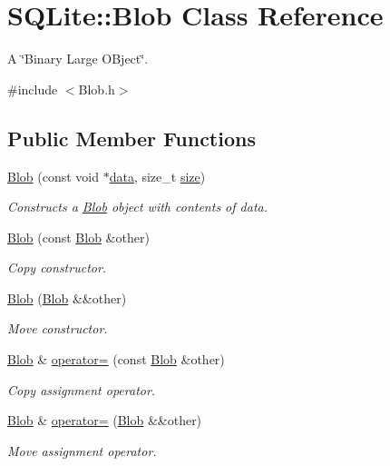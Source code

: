 \hypertarget{a00002}{\section{S\-Q\-Lite\-:\-:Blob Class Reference}
\label{a00002}
}


A \char`\"{}\-Binary Large O\-Bject\char`\"{}.  




{\ttfamily \#include $<$Blob.\-h$>$}

\subsection*{Public Member Functions}
\begin{DoxyCompactItemize}
\item 
\hyperlink{a00002_a74ff754db13f481b91edcd7b5bcd9d32}{Blob} (const void $\ast$\hyperlink{a00002_a112b54351792991f10563295e33600e2}{data}, size\-\_\-t \hyperlink{a00002_a689d499b628faaa148424af8d545c29e}{size})
\begin{DoxyCompactList}\small\item\em Constructs a \hyperlink{a00002}{Blob} object with contents of data. \end{DoxyCompactList}\item 
\hyperlink{a00002_a4f525d8e11e4361b808692eccb4e12a5}{Blob} (const \hyperlink{a00002}{Blob} \&other)
\begin{DoxyCompactList}\small\item\em Copy constructor. \end{DoxyCompactList}\item 
\hyperlink{a00002_ae458297c2b9be504111c7b23636942e0}{Blob} (\hyperlink{a00002}{Blob} \&\&other)
\begin{DoxyCompactList}\small\item\em Move constructor. \end{DoxyCompactList}\item 
\hyperlink{a00002}{Blob} \& \hyperlink{a00002_af34146d8ac8d1414c5ad1673ca05669e}{operator=} (const \hyperlink{a00002}{Blob} \&other)
\begin{DoxyCompactList}\small\item\em Copy assignment operator. \end{DoxyCompactList}\item 
\hyperlink{a00002}{Blob} \& \hyperlink{a00002_ae6409ebce61480b97f01c072f9e49276}{operator=} (\hyperlink{a00002}{Blob} \&\&other)
\begin{DoxyCompactList}\small\item\em Move assignment operator. \end{DoxyCompactList}\item 

\end{DoxyCompactItemize}
